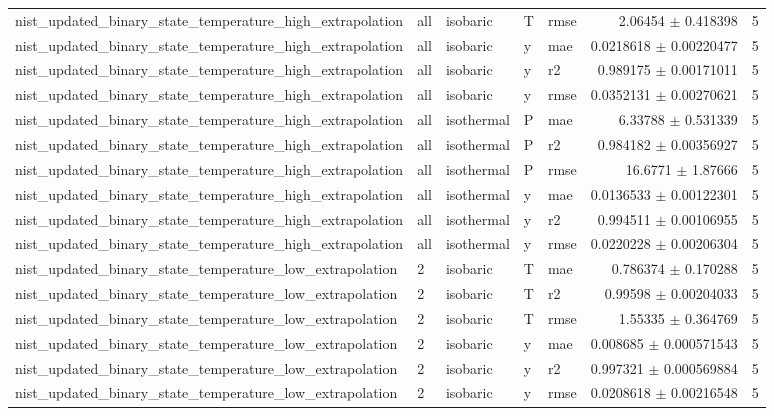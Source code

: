 \begin{tabular}{lllllrr}
nist\_updated\_binary\_state\_temperature\_high\_extrapolation & all & isobaric & T & rmse & 2.06454 $\pm$ 0.418398 & 5 \\
nist\_updated\_binary\_state\_temperature\_high\_extrapolation & all & isobaric & y & mae & 0.0218618 $\pm$ 0.00220477 & 5 \\
nist\_updated\_binary\_state\_temperature\_high\_extrapolation & all & isobaric & y & r2 & 0.989175 $\pm$ 0.00171011 & 5 \\
nist\_updated\_binary\_state\_temperature\_high\_extrapolation & all & isobaric & y & rmse & 0.0352131 $\pm$ 0.00270621 & 5 \\
nist\_updated\_binary\_state\_temperature\_high\_extrapolation & all & isothermal & P & mae & 6.33788 $\pm$ 0.531339 & 5 \\
nist\_updated\_binary\_state\_temperature\_high\_extrapolation & all & isothermal & P & r2 & 0.984182 $\pm$ 0.00356927 & 5 \\
nist\_updated\_binary\_state\_temperature\_high\_extrapolation & all & isothermal & P & rmse & 16.6771 $\pm$ 1.87666 & 5 \\
nist\_updated\_binary\_state\_temperature\_high\_extrapolation & all & isothermal & y & mae & 0.0136533 $\pm$ 0.00122301 & 5 \\
nist\_updated\_binary\_state\_temperature\_high\_extrapolation & all & isothermal & y & r2 & 0.994511 $\pm$ 0.00106955 & 5 \\
nist\_updated\_binary\_state\_temperature\_high\_extrapolation & all & isothermal & y & rmse & 0.0220228 $\pm$ 0.00206304 & 5 \\
nist\_updated\_binary\_state\_temperature\_low\_extrapolation & 2 & isobaric & T & mae & 0.786374 $\pm$ 0.170288 & 5 \\
nist\_updated\_binary\_state\_temperature\_low\_extrapolation & 2 & isobaric & T & r2 & 0.99598 $\pm$ 0.00204033 & 5 \\
nist\_updated\_binary\_state\_temperature\_low\_extrapolation & 2 & isobaric & T & rmse & 1.55335 $\pm$ 0.364769 & 5 \\
nist\_updated\_binary\_state\_temperature\_low\_extrapolation & 2 & isobaric & y & mae & 0.008685 $\pm$ 0.000571543 & 5 \\
nist\_updated\_binary\_state\_temperature\_low\_extrapolation & 2 & isobaric & y & r2 & 0.997321 $\pm$ 0.000569884 & 5 \\
nist\_updated\_binary\_state\_temperature\_low\_extrapolation & 2 & isobaric & y & rmse & 0.0208618 $\pm$ 0.00216548 & 5 \\

\end{tabular}
